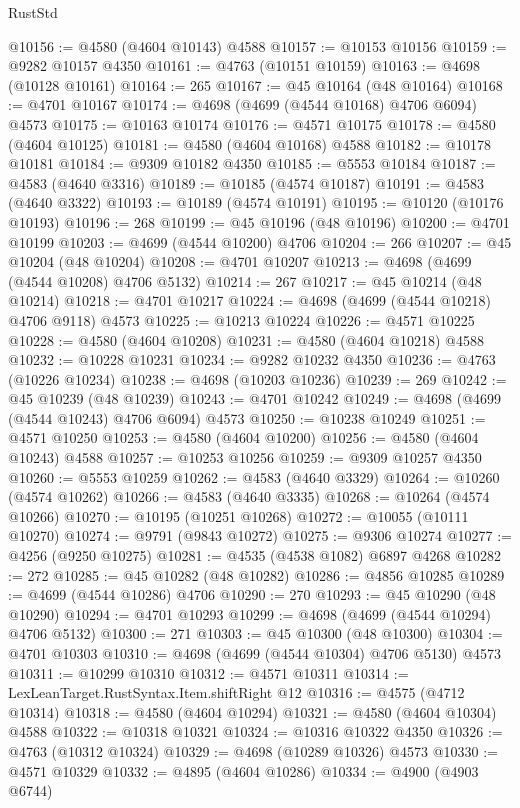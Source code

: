 \begin{lexlean}{RustStd}
\begin{coremodule}
@10156 := @4580 (@4604 @10143) @4588
@10157 := @10153 @10156
@10159 := @9282 @10157 @4350
@10161 := @4763 (@10151 @10159)
@10163 := @4698 (@10128 @10161)
@10164 := 265
@10167 := @45 @10164 (@48 @10164)
@10168 := @4701 @10167
@10174 := @4698 (@4699 (@4544 @10168) @4706 @6094) @4573
@10175 := @10163 @10174
@10176 := @4571 @10175
@10178 := @4580 (@4604 @10125)
@10181 := @4580 (@4604 @10168) @4588
@10182 := @10178 @10181
@10184 := @9309 @10182 @4350
@10185 := @5553 @10184
@10187 := @4583 (@4640 @3316)
@10189 := @10185 (@4574 @10187)
@10191 := @4583 (@4640 @3322)
@10193 := @10189 (@4574 @10191)
@10195 := @10120 (@10176 @10193)
@10196 := 268
@10199 := @45 @10196 (@48 @10196)
@10200 := @4701 @10199
@10203 := @4699 (@4544 @10200) @4706
@10204 := 266
@10207 := @45 @10204 (@48 @10204)
@10208 := @4701 @10207
@10213 := @4698 (@4699 (@4544 @10208) @4706 @5132)
@10214 := 267
@10217 := @45 @10214 (@48 @10214)
@10218 := @4701 @10217
@10224 := @4698 (@4699 (@4544 @10218) @4706 @9118) @4573
@10225 := @10213 @10224
@10226 := @4571 @10225
@10228 := @4580 (@4604 @10208)
@10231 := @4580 (@4604 @10218) @4588
@10232 := @10228 @10231
@10234 := @9282 @10232 @4350
@10236 := @4763 (@10226 @10234)
@10238 := @4698 (@10203 @10236)
@10239 := 269
@10242 := @45 @10239 (@48 @10239)
@10243 := @4701 @10242
@10249 := @4698 (@4699 (@4544 @10243) @4706 @6094) @4573
@10250 := @10238 @10249
@10251 := @4571 @10250
@10253 := @4580 (@4604 @10200)
@10256 := @4580 (@4604 @10243) @4588
@10257 := @10253 @10256
@10259 := @9309 @10257 @4350
@10260 := @5553 @10259
@10262 := @4583 (@4640 @3329)
@10264 := @10260 (@4574 @10262)
@10266 := @4583 (@4640 @3335)
@10268 := @10264 (@4574 @10266)
@10270 := @10195 (@10251 @10268)
@10272 := @10055 (@10111 @10270)
@10274 := @9791 (@9843 @10272)
@10275 := @9306 @10274
@10277 := @4256 (@9250 @10275)
@10281 := @4535 (@4538 @1082) @6897 @4268
@10282 := 272
@10285 := @45 @10282 (@48 @10282)
@10286 := @4856 @10285
@10289 := @4699 (@4544 @10286) @4706
@10290 := 270
@10293 := @45 @10290 (@48 @10290)
@10294 := @4701 @10293
@10299 := @4698 (@4699 (@4544 @10294) @4706 @5132)
@10300 := 271
@10303 := @45 @10300 (@48 @10300)
@10304 := @4701 @10303
@10310 := @4698 (@4699 (@4544 @10304) @4706 @5130) @4573
@10311 := @10299 @10310
@10312 := @4571 @10311
@10314 := LexLeanTarget.RustSyntax.Item.shiftRight @12
@10316 := @4575 (@4712 @10314)
@10318 := @4580 (@4604 @10294)
@10321 := @4580 (@4604 @10304) @4588
@10322 := @10318 @10321
@10324 := @10316 @10322 @4350
@10326 := @4763 (@10312 @10324)
@10329 := @4698 (@10289 @10326) @4573
@10330 := @4571 @10329
@10332 := @4895 (@4604 @10286)
@10334 := @4900 (@4903 @6744)

\end{coremodule}
\end{lexlean}
